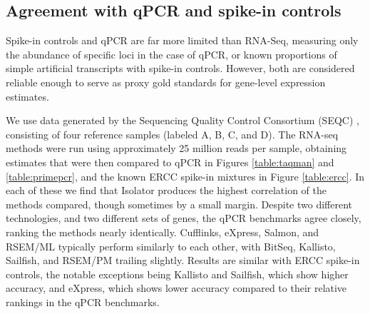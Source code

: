 \documentclass[twocolumn]{article}
\begin{document}
\subsection{Agreement with qPCR and spike-in controls}

Spike-in controls and qPCR are far more limited than RNA-Seq, measuring
only the abundance of specific loci in the case of qPCR, or known
proportions of simple artificial transcripts with spike-in controls.
However, both are considered reliable enough to serve as proxy gold
standards for gene-level expression estimates.

We use data generated by the Sequencing Quality Control Consortium (SEQC)
\cite{Consortium:2014kc}, consisting of four reference samples (labeled A, B, C,
and D). The RNA-seq methods were run using approximately 25 million reads per
sample, obtaining estimates that were then compared to qPCR in Figures
\ref{table:taqman} and \ref{table:primepcr}, and the known ERCC spike-in
mixtures in Figure \ref{table:ercc}. In each of these we find that Isolator
produces the highest correlation of the methods compared, though sometimes by a
small margin. Despite two different technologies, and two different sets of
genes, the qPCR benchmarks agree closely, ranking the methods nearly
identically. Cufflinks, eXpress, Salmon, and RSEM/ML typically perform similarly
to each other, with BitSeq, Kallisto, Sailfish, and RSEM/PM trailing slightly.
Results are similar with ERCC spike-in controls, the notable exceptions being
Kallisto and Sailfish, which show higher accuracy, and eXpress, which shows
lower accuracy compared to their relative rankings in the qPCR benchmarks.
\end{document}
